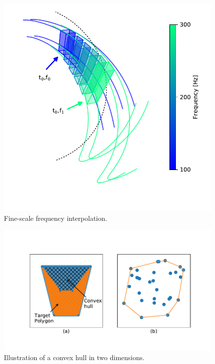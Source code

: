 \begin{figure}
\begin{center}
\includegraphics{figures/delaunay_2.pdf}
\caption{Fine-scale frequency interpolation.}
\label{fig:delaunay_2}
\end{center}
\end{figure}

\begin{figure}
\begin{center}
\includegraphics{figures/convex_hulls.pdf}
\caption{Illustration of a convex hull in two dimensions.}
\label{fig:convex_hulls}
\end{center}
\end{figure}



